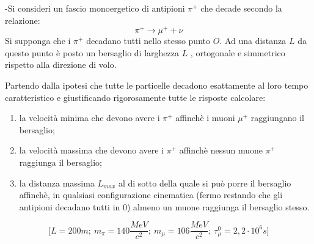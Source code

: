 \documentclass[12pt,twoside,a4]{article}
\begin{document}
\begin{esercizio}
	-Si consideri un fascio monoergetico di antipioni $\pi^+$ che decade secondo la relazione:
	\begin{equation*}
		\pi^+ \rightarrow \mu^+ + \nu
	\end{equation*}
Si supponga che i $\pi^+$ decadano tutti nello stesso punto $O$. Ad una distanza $L$ da questo punto è posto un bersaglio di larghezza $L$ , ortogonale e simmetrico rispetto alla direzione di volo.

Partendo dalla ipotesi che tutte le particelle decadono esattamente al loro tempo caratteristico e giustificando rigorosamente tutte le risposte calcolare:
\begin{enumerate}[label=(\textit{\roman*})]
	\item la velocità minima che devono avere i $\pi^+$ affinchè i muoni $\mu^+$ raggiungano il bersaglio;
	\item la velocità massima che devono avere i $\pi^+$ affinchè nessun muone $\pi^+$ raggiunga il bersaglio;
	\item la distanza massima $L_{max}$ al di sotto della quale si può porre il bersaglio affinchè, in qualsiasi configurazione cinematica (fermo restando che gli antipioni decadano tutti in $0$) almeno un muone raggiunga il bersaglio stesso.
\end{enumerate}
\begin{equation*}
	\Big[L=200m; \ m_\pi=140 \frac{MeV}{c^2}; \ m_\mu = 106 \frac{MeV}{c^2}; \ \tau_\mu^0 = 2,2 \cdot 10^6 s \Big] 
\end{equation*}
\end{esercizio}
\end{document}
